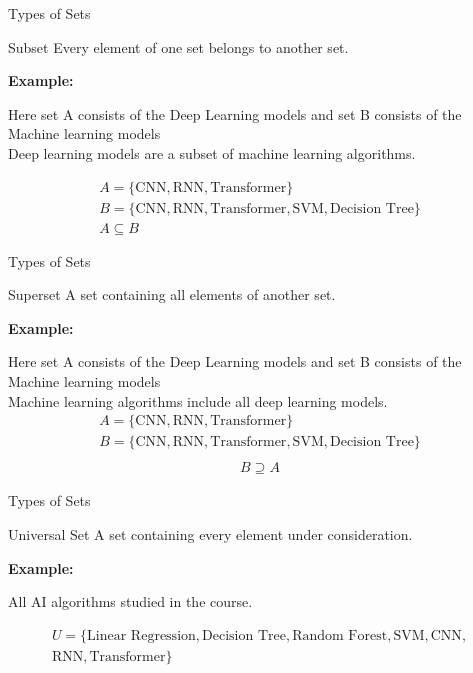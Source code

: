 \documentclass{beamer}
\begin{document}
\begin{frame}{Types of Sets}

\begin{block}{Subset}
Every element of one set belongs to another set.
\end{block}

\textbf{Example:}

Here set A consists of the Deep Learning models and set B consists of the \\
Machine learning models\\
Deep learning models are a subset of machine learning algorithms.

\begin{gather*}
A=\{\text{CNN},
\text{RNN},
\text{Transformer}\}\\
B=\{\text{CNN},
\text{RNN},
\text{Transformer},
\text{SVM},
\text{Decision Tree}\}\\
A\subseteq B
\end{gather*}

\end{frame}

\begin{frame}{Types of Sets}

\begin{block}{Superset}
A set containing all elements of another set.
\end{block}

\textbf{Example:}

Here set A consists of the Deep Learning models and set B consists of the \\
Machine learning models\\
Machine learning algorithms include all deep learning models.
\begin{gather*}
A=\{\text{CNN},
\text{RNN},
\text{Transformer}\}\\
B=\{\text{CNN},
\text{RNN},
\text{Transformer},
\text{SVM},
\text{Decision Tree}\}\\
\end{gather*}
\begin{gather*}
B\supseteq A
\end{gather*}

\end{frame}

\begin{frame}{Types of Sets}

\begin{block}{Universal Set}
A set containing every element under consideration.
\end{block}

\textbf{Example:}

All AI algorithms studied in the course.

\begin{gather*}
U=\{
\text{Linear Regression},
\text{Decision Tree},
\text{Random Forest},
\text{SVM},
\text{CNN},\\
\text{RNN},
\text{Transformer}
\}
\end{gather*}

\end{frame}
\end{document}
